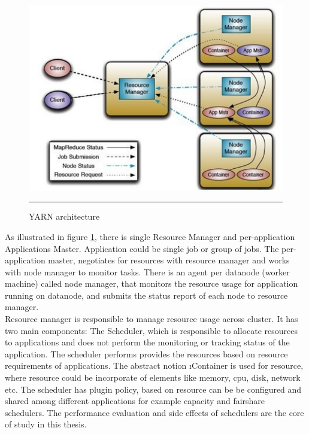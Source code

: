 \begin{figure}[htbp]
  \centering
    \includegraphics[width=10 cm,height=10 cm]{./Figures/yarn.pdf}
    \rule{25em}{0.5pt}
  \caption{YARN‌ architecture \cite{yarn}}
  \label{yarn}
\end{figure}

As illustrated in figure \ref{yarn}, there is single Resource Manager and per-application Applications Master. Application could be single job or group of jobs. The per-application master, negotiates for resources with resource manager and works with node manager to monitor tasks. There is an agent per datanode (worker machine) called node manager, that  monitors the resource usage for application running on datanode, and submits the status report of each node to resource manager.\\
 
Resource manager is responsible to manage resource usage across cluster. It has two main components:
The Scheduler, which is responsible to allocate resources to applications and does not perform the monitoring or tracking status of the application. The scheduler performs provides the resources based on resource requirements of applications. The abstract notion \i{Container} is used for resource, where resource could be incorporate of elements like memory, cpu, disk, network etc. The scheduler has plugin policy, based on resource can be be configured and shared among different applications for example capacity and fairshare schedulers. The performance evaluation and side effects of schedulers are the core of study in this thesis.\\

